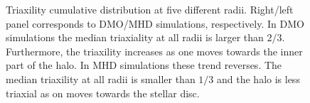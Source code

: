 \documentclass[usenatbib]{mnras}
\begin{document}
\begin{figure}
\caption{Triaxility cumulative distribution at five different radii.
  Right/left panel corresponds to DMO/MHD simulations, respectively. 
  In DMO simulations the median triaxiality at all radii is larger
  than $2/3$. Furthermore, the triaxility increases as one moves
  towards the inner part of the halo.
  In MHD simulations these trend reverses.
  The median triaxility at all radii is smaller than $1/3$ and the
  halo is less triaxial as on moves towards the stellar disc.}
\label{fig:triaxial_cumulative}
\end{figure}
\end{document}
